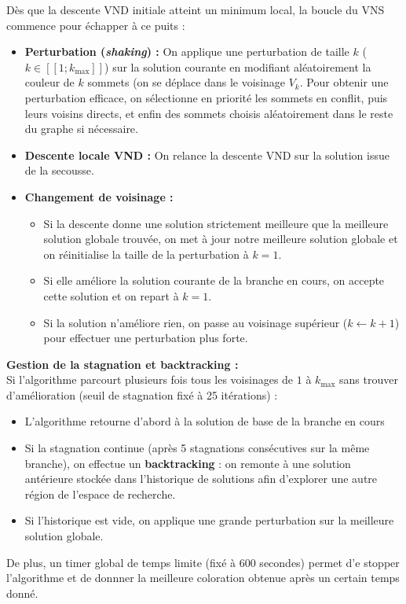 \documentclass{article}
\begin{document}
Dès que la descente VND initiale atteint un minimum local, la boucle du VNS commence pour échapper à ce puits :

\begin{itemize}
    \item \textbf{Perturbation (\textit{shaking}) :} On applique une perturbation de taille $k$ ($k \in [\![1; k_{\max}]\!]$) sur la solution courante en modifiant aléatoirement la couleur de $k$ sommets (on se déplace dans le voisinage $V_k$. Pour obtenir une perturbation efficace, on sélectionne en priorité les sommets en conflit, puis leurs voisins directs, et enfin des sommets choisis aléatoirement dans le reste du graphe si nécessaire.
    \item \textbf{Descente locale VND :} On relance la descente VND sur la solution issue de la secousse.
    \item \textbf{Changement de voisinage :}
    \begin{itemize}
        \item Si la descente donne une solution strictement meilleure que la meilleure solution globale trouvée, on met à jour notre meilleure solution globale et on réinitialise la taille de la perturbation à $k = 1$.
        \item Si elle améliore la solution courante de la branche en cours, on accepte cette solution et on repart à $k = 1$.
        \item Si la solution n'améliore rien, on passe au voisinage supérieur ($k \leftarrow k + 1$) pour effectuer une perturbation plus forte.
    \end{itemize}
\end{itemize}

\textbf{Gestion de la stagnation et backtracking :}\\
Si l'algorithme parcourt plusieurs fois tous les voisinages de $1$ à $k_{\max}$ sans trouver d'amélioration (seuil de stagnation fixé à 25 itérations) :
\begin{itemize}
    \item L'algorithme retourne d'abord à la solution de base de la branche en cours
    \item Si la stagnation continue (après 5 stagnations consécutives sur la même branche), on effectue un \textbf{backtracking} : on remonte à une solution antérieure stockée dans l'historique de solutions afin d'explorer une autre région de l'espace de recherche.
    \item Si l'historique est vide, on applique une grande perturbation sur la meilleure solution globale.
\end{itemize}
De plus, un timer global de temps limite (fixé à 600 secondes) permet d'e stopper l'algorithme et de donnner la meilleure coloration obtenue après un certain temps donné.
\end{document}
